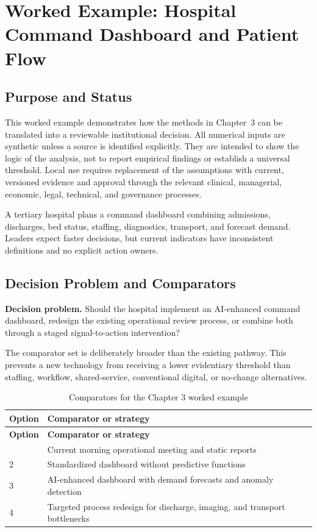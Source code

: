 \section{Worked Example: Hospital Command Dashboard and Patient Flow}
\label{sec:comp-ch03-worked-example}

\subsection{Purpose and Status}
This worked example demonstrates how the methods in Chapter~3 can be
translated into a reviewable institutional decision. All numerical inputs are
synthetic unless a source is identified explicitly. They are intended to show the
logic of the analysis, not to report empirical findings or establish a universal
threshold. Local use requires replacement of the assumptions with current,
versioned evidence and approval through the relevant clinical, managerial,
economic, legal, technical, and governance processes.

A tertiary hospital plans a command dashboard combining admissions, discharges, bed status, staffing, diagnostics, transport, and forecast demand. Leaders expect faster decisions, but current indicators have inconsistent definitions and no explicit action owners. 

\subsection{Decision Problem and Comparators}
\textbf{Decision problem.} Should the hospital implement an AI-enhanced command dashboard, redesign the existing operational review process, or combine both through a staged signal-to-action intervention?

The comparator set is deliberately broader than the existing pathway. This prevents
a new technology from receiving a lower evidentiary threshold than staffing,
workflow, shared-service, conventional digital, or no-change alternatives.

\begin{longtable}{@{}p{}p{}@{}}
\caption{Comparators for the Chapter 3 worked example}
\label{tab:comp-ch03-comparators}\\
\toprule
\textbf{Option} & \textbf{Comparator or strategy} \\
\midrule
\endfirsthead
\toprule
\textbf{Option} & \textbf{Comparator or strategy} \\
\midrule
\endhead
\bottomrule
\endlastfoot
1 & Current morning operational meeting and static reports \\
2 & Standardized dashboard without predictive functions \\
3 & AI-enhanced dashboard with demand forecasts and anomaly detection \\
4 & Targeted process redesign for discharge, imaging, and transport bottlenecks \\
\end{longtable}


